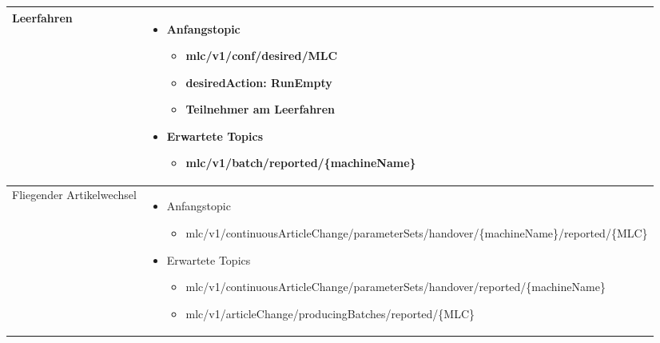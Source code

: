 \begin{longtable}{p{2.5cm} p{12cm}}
    \midrule Leerfahren & \begin{itemize} \item Anfangstopic \begin{itemize} \item mlc/v1/conf/desired/{MLC} \item desiredAction: RunEmpty \item Teilnehmer am Leerfahren \end{itemize} \item Erwartete Topics \begin{itemize} \item mlc/v1/batch/reported/\{machineName\} \end{itemize} \end{itemize} \\ \midrule Fliegender Artikelwechsel & \begin{itemize} \item Anfangstopic \begin{itemize} \item mlc/v1/continuousArticleChange/parameterSets/hand\-over/\{machineName\}/reported/\{MLC\} \end{itemize} \item Erwartete Topics \begin{itemize} \item mlc/v1/continuousArticleChange/parameterSets/hand\-over/reported/\{machineName\} \item mlc/v1/articleChange/producingBatches/reported/\{MLC\} \end{itemize} \end{itemize} \\ 
    \bottomrule 
\end{longtable}

